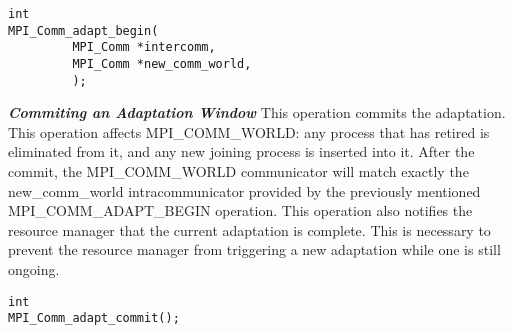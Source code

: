 \begin{lstlisting}[frame=single]
int
MPI_Comm_adapt_begin( 
         MPI_Comm *intercomm,
         MPI_Comm *new_comm_world,
         );
\end{lstlisting}
\textbf{\textit{Commiting an Adaptation Window}} This operation commits the adaptation. This operation affects MPI{\_}COMM{\_}WORLD: any process that has retired is eliminated from it, and any new joining process is inserted into it. After the commit, the MPI{\_}COMM{\_}WORLD communicator will match exactly the new{\_}comm{\_}world intracommunicator provided by the previously mentioned MPI{\_}COMM{\_}ADAPT{\_}BEGIN operation. This operation also notifies the resource manager that the current adaptation is complete. This is necessary to prevent the resource manager from triggering a new adaptation while one is still ongoing.
\begin{lstlisting}[frame=single]
int
MPI_Comm_adapt_commit(); 
\end{lstlisting}
